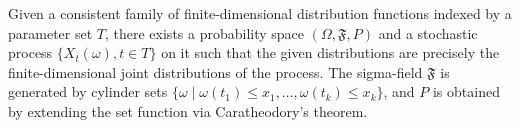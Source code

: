 Given a consistent family of finite-dimensional distribution functions indexed by a parameter set $T$, there exists a probability space $(\Omega, \mathfrak{F}, P)$ and a stochastic process $\{X_t(\omega), t \in T\}$ on it such that the given distributions are precisely the finite-dimensional joint distributions of the process. The sigma-field $\mathfrak{F}$ is generated by cylinder sets $\{\omega \mid \omega(t_1) \leq x_1, \ldots, \omega(t_k) \leq x_k\}$, and $P$ is obtained by extending the set function via Caratheodory's theorem.
